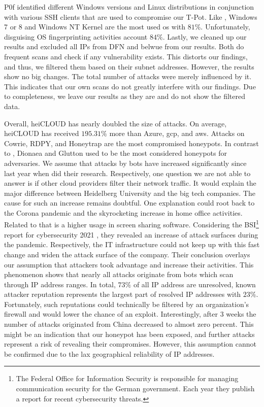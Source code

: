 P0f identified different Windows versions and Linux distributions in conjunction with various SSH clients that are used to compromise our T-Pot.
Like \citet{Kelly2021}, Windows 7 or 8 and Windows NT Kernel are the most used \ac{os} with $81\%$.
Unfortunately, disguising OS fingerprinting activities account $84\%$.
Lastly, we cleaned up our results and excluded all IPs from DFN and \acs{belwue} from our results.
Both do frequent scans and check if any vulnerability exists.
This distorts our findings, and thus, we filtered them based on their subnet addresses.
However, the results show no big changes.
The total number of attacks were merely influenced by it.
This indicates that our own scans do not greatly interfere with our findings.
Due to completeness, we leave our results as they are and do not show the filtered data.

Overall, heiCLOUD has nearly doubled the size of attacks.
On average, heiCLOUD has received $195.31\%$ more than Azure, \ac{gcp}, and \ac{aws}.
Attacks on Cowrie, RDPY, and Honeytrap are the most compromised honeypots.
In contrast to \citet{Kelly2021}, Dionaea and Glutton used to be the most considered honeypots for adversaries.
We assume that attacks by bots have increased significantly since last year when \citet{Kelly2021} did their research.
Respectively, one question we are not able to answer is if other cloud providers filter their network traffic.
It would explain the major difference between Heidelberg University and the big tech companies.
The cause for such an increase remains doubtful.
One explanation could root back to the Corona pandemic and the skyrocketing increase in home office activities.
Related to that is a higher usage in screen sharing software.
Considering the BSI\footnote{The Federal Office for Information Security is responsible for managing communication security for the German government. Each year they publish a report for recent cybersecurity threats.} report for cybersecurity 2021 \cite{bsi2021}, they revealed an increase of attack surfaces during the pandemic.
Respectively, the IT infrastructure could not keep up with this fast change and widen the attack surface of the company.
Their conclusion overlays our assumption that attackers took advantage and increase their activities.
This phenomenon shows that nearly all attacks originate from bots which scan through IP address ranges.
In total, $73\%$ of all IP address are unresolved, known attacker reputation represents the largest part of resolved IP addresses with $23\%$.
Fortunately, such reputations could technically be filtered by an organization's firewall and would lower the chance of an exploit.
Interestingly, after 3 weeks the number of attacks originated from China decreased to almost zero percent.
This might be an indication that our honeypot has been exposed, and further attacks represent a risk of revealing their compromises.
However, this assumption cannot be confirmed due to the lax geographical reliability of IP addresses.


